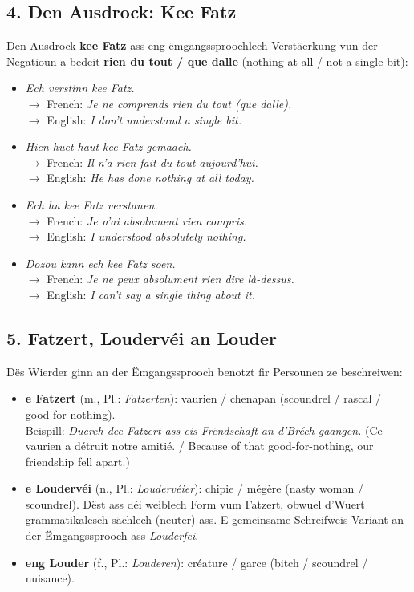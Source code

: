 \subsection*{4. Den Ausdrock: Kee Fatz}
Den Ausdrock \textbf{kee Fatz} ass eng ëmgangssproochlech Verstäerkung vun der Negatioun a bedeit \textbf{rien du tout / que dalle} (nothing at all / not a single bit):
\begin{itemize}
    \item \textit{Ech verstinn kee Fatz.} \\
    $\rightarrow$ French: \textit{Je ne comprends rien du tout (que dalle).} \\
    $\rightarrow$ English: \textit{I don't understand a single bit.}
    
    \item \textit{Hien huet haut kee Fatz gemaach.} \\
    $\rightarrow$ French: \textit{Il n'a rien fait du tout aujourd'hui.} \\
    $\rightarrow$ English: \textit{He has done nothing at all today.}
    
    \item \textit{Ech hu kee Fatz verstanen.} \\
    $\rightarrow$ French: \textit{Je n'ai absolument rien compris.} \\
    $\rightarrow$ English: \textit{I understood absolutely nothing.}
    
    \item \textit{Dozou kann ech kee Fatz soen.} \\
    $\rightarrow$ French: \textit{Je ne peux absolument rien dire là-dessus.} \\
    $\rightarrow$ English: \textit{I can't say a single thing about it.}
\end{itemize}

\subsection*{5. Fatzert, Loudervéi an Louder}
Dës Wierder ginn an der Ëmgangssprooch benotzt fir Persounen ze beschreiwen:
\begin{itemize}
    \item \textbf{e Fatzert} (m., Pl.: \textit{Fatzerten}): vaurien / chenapan (scoundrel / rascal / good-for-nothing). \\
    Beispill: \textit{Duerch dee Fatzert ass eis Frëndschaft an d'Bréch gaangen.} (Ce vaurien a détruit notre amitié. / Because of that good-for-nothing, our friendship fell apart.)
    
    \item \textbf{e Loudervéi} (n., Pl.: \textit{Loudervéier}): chipie / mégère (nasty woman / scoundrel). Dëst ass déi weiblech Form vum Fatzert, obwuel d'Wuert grammatikalesch sächlech (neuter) ass. E gemeinsame Schreifweis-Variant an der Ëmgangssprooch ass \textit{Louderfei}.
    
    \item \textbf{eng Louder} (f., Pl.: \textit{Louderen}): créature / garce (bitch / scoundrel / nuisance).
\end{itemize}

